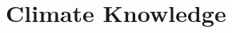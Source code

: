 \documentclass[aspectratio=169,9pt,dvipsnames]{beamer}
\begin{document}

%


\section{Climate Knowledge}

\end{document}

